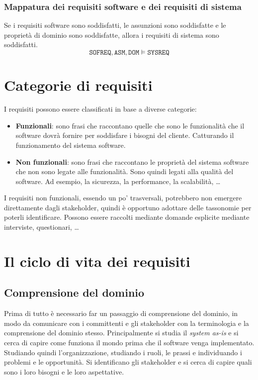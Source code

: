 \subsubsection{Mappatura dei requisiti software e dei requisiti di sistema}
Se i requisiti software sono soddisfatti, le assunzioni sono soddisfatte e 
le proprietà di dominio sono soddisfatte, allora i requisiti di sistema
sono soddisfatti. 
\[
\texttt{SOFREQ}, \texttt{ASM}, \texttt{DOM} \models \texttt{SYSREQ}
\]
\section{Categorie di requisiti}
I requisiti possono essere classificati in base a diverse categorie:
\begin{itemize}
    \item \textbf{Funzionali}: sono frasi che raccontano quelle che sono 
    le funzionalità che il software dovrà fornire per soddisfare i bisogni
    del cliente. Catturando il funzionamento del sistema software.
    \item \textbf{Non funzionali}: sono frasi che raccontano le proprietà
    del sistema software che non sono legate alle funzionalità. Sono quindi
    legati alla qualità del software. Ad esempio, la sicurezza, la 
    performance, la scalabilità, \dots
\end{itemize}
I requisiti non funzionali, essendo un po' trasversali, potrebbero non emergere 
direttamente dagli stakeholder, quindi è opportuno adottare delle tassonomie 
per poterli identificare.
Possono essere raccolti mediante domande esplicite mediante interviste,
questionari, \dots
\section{Il ciclo di vita dei requisiti}
\subsection{Comprensione del dominio}
Prima di tutto è necessario far un passaggio di comprensione del dominio, 
in modo da comunicare con i committenti e gli stakeholder con la terminologia e 
la comprensione del dominio stesso. 
Principalmente si studia il \textit{system as-is} e si cerca di capire come funziona 
il mondo prima che il software venga implementato. Studiando quindi l'organizzazione,
studiando i ruoli, le prassi e individuando i problemi e le opportunità.
Si identificano gli stakeholder e si cerca di capire quali sono i loro bisogni e
le loro aspettative.

